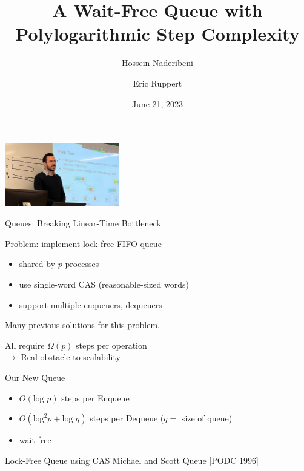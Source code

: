 \documentclass[compress]{beamer}
\title{A Wait-Free Queue with Polylogarithmic Step Complexity}
\author{Hossein Naderibeni \and Eric Ruppert}
\date{June 21, 2023}
\newcommand{\op}[1]{\mbox{\sc #1}}
\renewcommand{\log}{\mbox{log }} %
\begin{document}
\begin{frame}
\maketitle
\hspace*{29mm}\includegraphics[width=5cm]{Hossein.jpeg}

\end{frame}


\begin{frame}{Queues:  Breaking Linear-Time Bottleneck}

Problem:  implement lock-free FIFO queue
\begin{itemize}
\item shared by $p$ processes
\item use single-word CAS (reasonable-sized words)
\item support multiple enqueuers, dequeuers
\end{itemize}

\medskip
\pause

Many previous solutions for this problem.

\medskip

All require $\Omega(p)$ steps per operation\\
$\rightarrow$ Real obstacle to scalability

\pause
\begin{block}{Our New Queue}
\begin{itemize}
\item $O(\log p)$ steps per \op{Enqueue}
\item $O(\mbox{log}^2 p + \log q)$ steps per \op{Dequeue} ($q=$ size of queue)
\item wait-free
\end{itemize}
\end{block}


\end{frame}


\begin{frame}{Lock-Free Queue using CAS}
Michael and Scott Queue [PODC 1996]

\bigskip


\only<2>{}%
\only<3>{}%
\end{frame}
\end{document}
